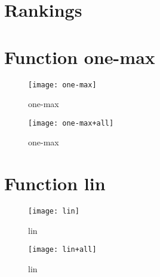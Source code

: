 \graphicspath{{../graphics/}}

\section{Rankings}
\begin{center}

\end{center}

\newpage

\section{Function one-max}
\begin{center}

\end{center}

\begin{center}
\begin{figure}[h]
\centering
\texttt{[image: one-max]}
\caption{one-max}
\end{figure}
\end{center}

\begin{center}
\begin{figure}[h]
\centering
\texttt{[image: one-max+all]}
\caption{one-max}
\end{figure}
\end{center}

\newpage

\section{Function lin}
\begin{center}

\end{center}

\begin{center}
\begin{figure}[h]
\centering
\texttt{[image: lin]}
\caption{lin}
\end{figure}
\end{center}

\begin{center}
\begin{figure}[h]
\centering
\texttt{[image: lin+all]}
\caption{lin}
\end{figure}
\end{center}

\newpage

